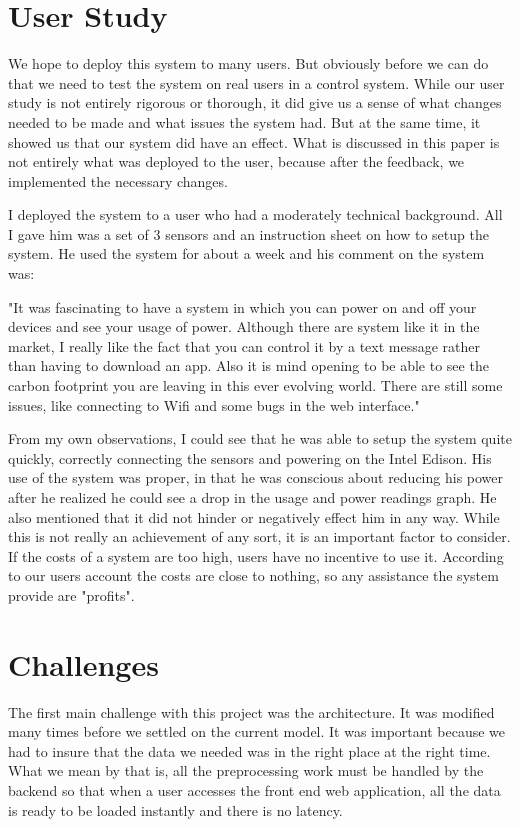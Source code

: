 \documentclass{sig-alternate-05-2015}
\begin{document}
\section{User Study}
We hope to deploy this system to many users. But obviously before we can do that we need to test the system on real users in a control system. While our user study is not entirely rigorous or thorough, it did give us a sense of what changes needed to be made and what issues the system had. But at the same time, it showed us that our system did have an effect. What is discussed in this paper is not entirely what was deployed to the user, because after the feedback, we implemented the necessary changes.

I deployed the system to a user who had a moderately technical background. All I gave him was a set of 3 sensors and an instruction sheet on how to setup the system. He used the system for about a week and his comment on the system was:

"It was fascinating to have a system in which you can power on and off your devices and see your usage of power. Although there are system like it in the market, I really like the fact that you can control it by a text message rather than having to download an app. Also it is mind opening to be able to see the carbon footprint you are leaving in this ever evolving world. There are still some issues, like connecting to Wifi and some bugs in the web interface."

From my own observations, I could see that he was able to setup the system quite quickly, correctly connecting the sensors and powering on the Intel Edison. His use of the system was proper, in that he was conscious about reducing his power after he realized he could see a drop in the usage and power readings graph. He also mentioned that it did not hinder or negatively effect him in any way. While this is not really an achievement of any sort, it is an important factor to consider. If the costs of a system are too high, users have no incentive to use it. According to our users account the costs are close to nothing, so any assistance the system provide are "profits".

\section{Challenges}
The first main challenge with this project was the architecture. It was modified many times before we settled on the current model. It was important because we had to insure that the data we needed was in the right place at the right time. What we mean by that is, all the preprocessing work must be handled by the backend so that when a user accesses the front end web application, all the data is ready to be loaded instantly and there is no latency.
\end{document}
